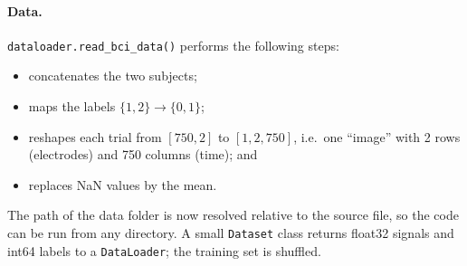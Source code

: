 \documentclass[11pt,a4paper]{article}
\begin{document}
\paragraph{Data.} \texttt{dataloader.read\_bci\_data()} performs the following steps:
\begin{itemize}
  \item concatenates the two subjects;
  \item maps the labels $\{1,2\}\to\{0,1\}$;
  \item reshapes each trial from $[750,2]$ to $[1,2,750]$, i.e.\ one ``image'' with 2 rows (electrodes) and 750 columns (time); and
  \item replaces NaN values by the mean.
\end{itemize}
The path of the data folder is now resolved relative to the source file, so the code can be run from any directory. A small \texttt{Dataset} class returns float32 signals and int64 labels to a \texttt{DataLoader}; the training set is shuffled.
\end{document}
